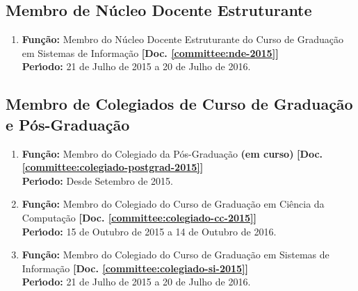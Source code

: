 \documentclass[a4paper,oneside,10pt]{article}
\begin{document}
\subsection{Membro de Núcleo Docente Estruturante}
\vspace{0.3cm}

\begin{enumerate}
\renewcommand{\labelenumi}{{\large\bfseries\arabic{enumi}.}}

\item   \textbf{Fun\c{c}\~{a}o:} Membro do Núcleo Docente Estruturante do Curso de Graduação em Sistemas de Informação \textbf{[Doc. \ref{committee:nde-2015}]}\\
        \textbf{Per\'{\i}odo:} 21 de Julho de 2015 a 20 de Julho de 2016.


\end{enumerate}


\subsection{Membro de Colegiados de Curso de Gradua\c{c}\~{a}o e P\'{o}s-Gradua\c{c}\~{a}o}
\vspace{0.3cm}

\begin{enumerate}
\renewcommand{\labelenumi}{{\large\bfseries\arabic{enumi}.}}

\item   \textbf{Fun\c{c}\~{a}o:} Membro do Colegiado da P\'{o}s-Gradua\c{c}\~{a}o \textbf{(em curso)}  \textbf{[Doc. \ref{committee:colegiado-postgrad-2015}]} \\
        \textbf{Per\'{\i}odo:} Desde Setembro de 2015.

\item   \textbf{Fun\c{c}\~{a}o:} Membro do Colegiado do Curso de Graduação em Ciência da Computação \textbf{[Doc. \ref{committee:colegiado-cc-2015}]} \\
        \textbf{Per\'{\i}odo:} 15 de Outubro de 2015 a 14 de Outubro de 2016.

\item   \textbf{Fun\c{c}\~{a}o:} Membro do Colegiado do Curso de Graduação em Sistemas de Informação \textbf{[Doc. \ref{committee:colegiado-si-2015}]} \\
        \textbf{Per\'{\i}odo:} 21 de Julho de 2015 a 20 de Julho de 2016.

\end{enumerate}
\end{document}

